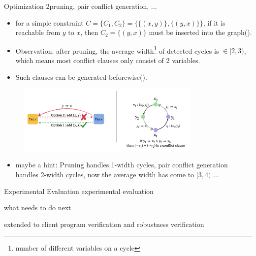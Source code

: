 \begin{frame}{Optimization 2}{pruning, pair conflict generation, ...}
	\scriptsize{
		\begin{itemize}
			\item for a simple constraint $C = \{C_1, C_2\} = \{\{(x, y)\}, \{(y, x)\}\}$, if it is reachable from $y$ to $x$, then $C_2 = \{(y, x)\}$ must be inserted into the graph().
			\item Observation: after pruning, the average width\footnote{\tiny{number of different variables on a cycle}} of detected cycles is $\in [2, 3)$, which means most conflict clauses only consist of 2 variables.
			\item Such clauses can be generated beforewise().
		\end{itemize}
	}

	\begin{figure}[H]
		\centering
		\includegraphics[width=0.8\textwidth]{figs/pruning-and-pair-conflict-generation.png}
	\end{figure}

	\begin{itemize}
		\item maybe a hint: Pruning handles 1-width cycles, pair conflict generation handles 2-width cycles, now the average width has come to $[3, 4)$ ...
	\end{itemize}
\end{frame}

\begin{frame}{Experimental Evaluation}
	experimental evaluation
\end{frame}

\begin{frame}
	what needs to do next
\end{frame}

\begin{frame}
	extended to client program verification and robustness verification
\end{frame}
